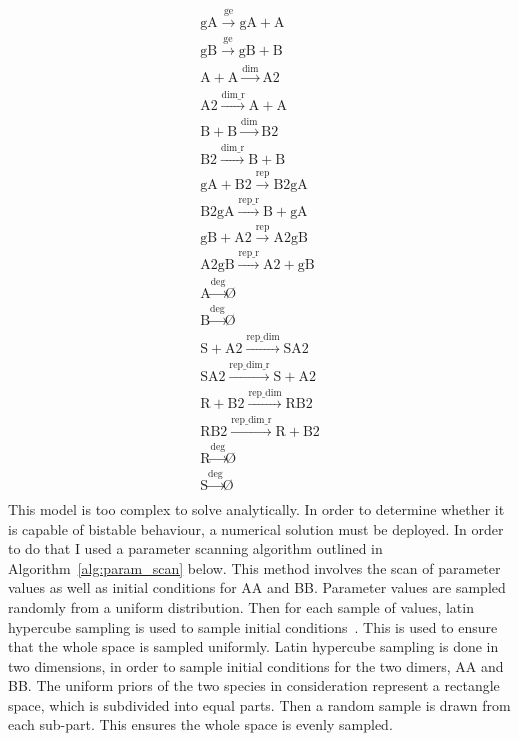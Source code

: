 $$
\begin{array}{cccc}
      \textrm{gA}\stackrel{\textrm{ge}}{\longrightarrow}\textrm{gA} + \textrm{A} \\
      \textrm{gB}\stackrel{\textrm{ge}}{\longrightarrow}\textrm{gB} + \textrm{B} \\
      \textrm{A} + \textrm{A} \stackrel{\textrm{dim}}{\longrightarrow}\textrm{A2} \\
      \textrm{A2} \stackrel{\textrm{dim\_r}}{\longrightarrow}\textrm{A} + \textrm{A} \\
      \textrm{B} + \textrm{B} \stackrel{\textrm{dim}}{\longrightarrow} \textrm{B2} \\
      \textrm{B2} \stackrel{\textrm{dim\_r}}{\longrightarrow}\textrm{B} + \textrm{B} \\
      \textrm{gA} + \textrm{B2} \stackrel{\textrm{rep}}{\longrightarrow}\textrm{B2gA} \\
      \textrm{B2gA} \stackrel{\textrm{rep\_r}}{\longrightarrow}\textrm{B} + \textrm{gA} \\
      \textrm{gB} + \textrm{A2} \stackrel{\textrm{rep}}{\longrightarrow}\textrm{A2gB} \\
      \textrm{A2gB} \stackrel{\textrm{rep\_r}}{\longrightarrow}\textrm{A2} + \textrm{gB} \\
      \textrm{A} \stackrel{\textrm{deg}}{\longrightarrow}\textrm{\O}\\
      \textrm{B} \stackrel{\textrm{deg}}{\longrightarrow}\textrm{\O}\\
      \textrm{S} + \textrm{A2} \stackrel{\textrm{rep\_dim}}{\longrightarrow}\textrm{SA2}\\
      \textrm{SA2} \stackrel{\textrm{rep\_dim\_r}}{\longrightarrow}\textrm{S} + \textrm{A2}\\
      \textrm{R} + \textrm{B2} \stackrel{\textrm{rep\_dim}}{\longrightarrow}\textrm{RB2}\\
      \textrm{RB2} \stackrel{\textrm{rep\_dim\_r}}{\longrightarrow}\textrm{R} + \textrm{B2}\\
      \textrm{R} \stackrel{\textrm{deg}}{\longrightarrow} \textrm{\O}\\
      \textrm{S} \stackrel{\textrm{deg}}{\longrightarrow}\textrm{\O}\\
\end{array}
$$
This model is too complex to solve analytically. In order to determine whether it is capable of bistable behaviour, a numerical solution must be deployed. In order to do that I used a parameter scanning algorithm outlined in Algorithm~\ref{alg:param_scan} below. This method involves the scan of parameter values as well as initial conditions for AA and BB. Parameter values are sampled randomly from a uniform distribution. Then for each sample of values, latin hypercube sampling is used to sample initial conditions~\autocite{MCKAY:2000vt}. This is used to ensure that the whole space is sampled uniformly. Latin hypercube sampling is done in two dimensions, in order to sample initial conditions for the two dimers, AA and BB. The uniform priors of the two species in consideration represent a rectangle space, which is subdivided into equal parts. Then a random sample is drawn from each sub-part. This ensures the whole space is evenly sampled. 
